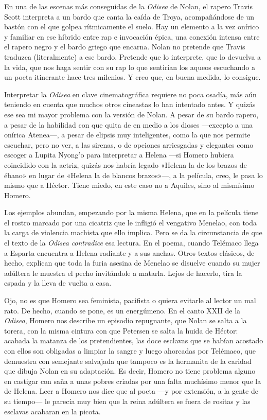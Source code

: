 \documentclass[11pt,a4paper]{article}
\begin{document}
En una de las escenas más conseguidas de la \emph{Odisea} de Nolan, el rapero Travis Scott interpreta a un bardo que canta la caída de Troya, acompañándose de un bastón con el que golpea rítmicamente el suelo. Hay un elemento a la vez onírico y familiar en ese híbrido entre rap e invocación épica, una conexión intensa entre el rapero negro y el bardo griego que encarna. Nolan no pretende que Travis traduzca (literalmente) a ese bardo. Pretende que lo interprete, que lo devuelva a la vida, que nos haga sentir con su rap lo que sentirían los aqueos escuchando a un poeta itinerante hace tres milenios. Y creo que, en buena medida, lo consigue. 

Interpretar la \emph{Odisea} en clave cinematográfica requiere no poca osadía, más aún teniendo en cuenta que muchos otros cineastas lo han intentado antes. Y quizás ese sea mi mayor problema con la versión de Nolan. A pesar de su bardo rapero, a pesar de la habilidad con que quita de en medio a los dioses ---excepto a una onírica Atenea---, a pesar de elipsis muy inteligentes, como la que nos permite escuchar, pero no ver, a las sirenas, o de opciones arriesgadas y elegantes como escoger a Lupita Nyong'o para interpretar a Helena ---si Homero hubiera coincidido con la actriz, quizás nos habría legado «Helena la de los brazos de ébano» en lugar de «Helena la de blancos brazos»---, a la película, creo, le pasa lo mismo que a Héctor. Tiene miedo, en este caso no a Aquiles, sino al mismísimo Homero.

Los ejemplos abundan, empezando por la misma Helena, que en la película tiene el rostro marcado por una cicatriz que le infligió el vengativo Menelao, con toda la carga de violencia machista que ello implica. Pero se da la circunstancia de que el texto de la \emph{Odisea} \emph{contradice} esa lectura. En el poema, cuando Telémaco llega a Esparta encuentra a Helena radiante y a sus anchas. Otros textos clásicos, de hecho, explican que toda la furia asesina de Menelao se disuelve cuando su mujer adúltera le muestra el pecho invitándole a matarla. Lejos de hacerlo, tira la espada y la lleva de vuelta a casa.

Ojo, no es que Homero sea feminista, pacifista o quiera evitarle al lector un mal rato. De hecho, cuando se pone, es un energúmeno.
En el canto XXII de la \emph{Odisea}, Homero nos describe un episodio repugnante, que Nolan se salta a la torera, con la misma cintura con que Petersen se salta la huida de Héctor: acabada la matanza de los pretendientes, las doce esclavas que se habían acostado con ellos son obligadas a limpiar la sangre y luego ahorcadas por Telémaco, que demuestra con semejante salvajada que tampoco es la hermanita de la caridad que dibuja Nolan en su adaptación. Es decir, Homero no tiene problema alguno en castigar con saña a unas pobres criadas por una falta muchísimo menor que la de Helena. Leer a Homero nos dice que al poeta ---y por extensión, a la gente de su tiempo--- le parecía muy bien que la reina adúltera se fuera de rositas y las esclavas acabaran en la picota.
\end{document}
